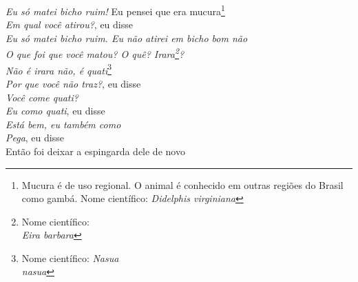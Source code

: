 \begin{linenumbers}
 
\noindent   \textit{Eu só matei bicho ruim!}
  Eu pensei que era mucura\footnote{Mucura é de uso regional. O animal é conhecido em outras regiões do Brasil como gambá. Nome científico: \textit{Didelphis virginiana}}\\ %
  \textit{Em qual você atirou?}, eu disse\\
  \textit{Eu só matei bicho ruim. Eu não atirei em bicho bom não}\\
  \textit{O que foi que você matou? O quê? Irara\footnote{Nome científico:\\
   \textit{Eira barbara}}?}\\
  \textit{Não é irara não, é quati}\footnote{Nome científico: \textit{Nasua\\
   nasua}}\\
  \textit{Por que você não traz?}, eu disse\\
  \textit{Você come quati?}\\
  \textit{Eu como quati}, eu disse\\
  \textit{Está bem, eu também como}\\
  \textit{Pega}, eu disse\\
  Então foi deixar a espingarda dele de novo
 
\end{linenumbers}

\bigskip

